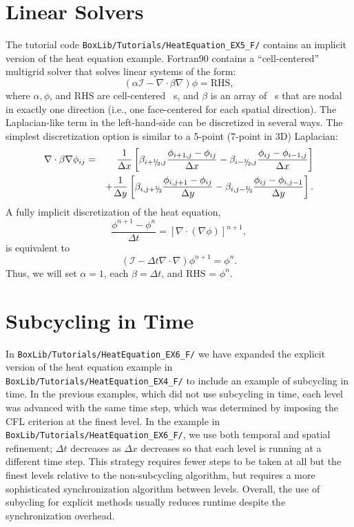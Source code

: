 \section{Linear Solvers}\label{Sec:Linear Solvers}
The tutorial code {\tt BoxLib/Tutorials/HeatEquation\_EX5\_F/} contains an implicit version of the heat equation 
example.  Fortran90 \BoxLib contains a ``cell-centered'' multigrid solver that solves linear systems of the form:
\begin{equation}
(\alpha\mathcal{I} - \nabla\cdot\beta\nabla)\phi = \text{RHS},
\end{equation}
where $\alpha, \phi$, and RHS are cell-centered \MultiFab~s, and $\beta$ is an array of \MultiFab~s that 
are nodal in exactly one direction (i.e., one face-centered \MultiFab for each spatial direction).
The Laplacian-like term in the left-hand-side can be discretized in several ways.  The simplest discretization
option is similar to a 5-point (7-point in 3D) Laplacian:
\begin{eqnarray}
\nabla\cdot\beta\nabla\phi_{ij} &=&
\frac{1}{\Delta x} \left[\beta_{i+\myhalf,j}\frac{\phi_{i+1,j} - \phi_{ij}}{\Delta x} - \beta_{i-\myhalf,j}\frac{\phi_{ij} - \phi_{i-1,j}}{\Delta x}\right]\nonumber\\
&&+ \frac{1}{\Delta y} \left[\beta_{i,j+\myhalf}\frac{\phi_{i,j+1} - \phi_{ij}}{\Delta y} - \beta_{i,j-\myhalf}\frac{\phi_{ij} - \phi_{i,j-1}}{\Delta y}\right].
\end{eqnarray}
A fully implicit discretization of the heat equation,
\begin{equation}
\frac{\phi^{n+1} - \phi^n}{\Delta t} = \left[\nabla\cdot(\nabla\phi)\right]^{n+1},
\end{equation}
is equivalent to
\begin{equation}
(\mathcal{I} - \Delta t\nabla\cdot\nabla)\phi^{n+1} = \phi^n.
\end{equation}
Thus, we will set $\alpha=1$, each $\beta=\Delta t$, and RHS = $\phi^n$.

\section{Subcycling in Time}\label{Sec:Subcycling}
In {\tt BoxLib/Tutorials/HeatEquation\_EX6\_F/} we have expanded the explicit version 
of the heat equation example in {\tt BoxLib/Tutorials/HeatEquation\_EX4\_F/} 
to include an example of subcycling in time.  In the previous examples, which did not
use subcycling in time, each level was advanced with the same time step, which was determined
by imposing the CFL criterion at the finest level.  In the example in 
{\tt BoxLib/Tutorials/HeatEquation\_EX6\_F/}, we use both temporal and spatial refinement;
$\Delta t$ decreases as $\Delta x$ decreases so that each level is running at a different
time step.  This strategy requires fewer steps to be taken at all but the finest levels
relative to the non-subcycling algorithm, but requires a more sophisticated synchronization algorithm 
between levels.  Overall, the use of subycling for explicit methods usually reduces runtime despite the 
synchronization overhead.

